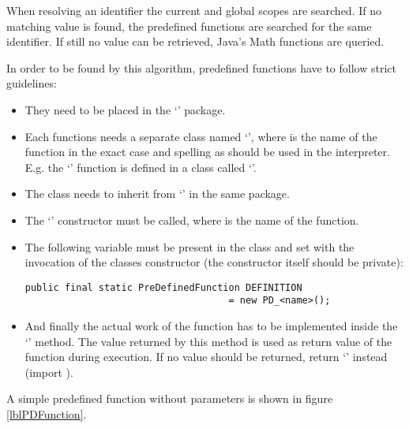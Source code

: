 When resolving an identifier the current and global scopes are searched. If no matching value is found, the predefined functions are searched for the same identifier. If still no value can be retrieved, Java's Math functions are queried.

In order to be found by this algorithm, predefined functions have to follow strict guidelines:

\begin{itemize}
	\item They need to be placed in the `' package.
	\item Each functions needs a separate class named `', where  is the name of the function in the exact case and spelling as should be used in the interpreter.\\
		E.g. the `' function is defined in a class called `'.
	\item The class needs to inherit from `' in the same package.
	\item The `' constructor must be called, where  is the name of the function.
	\item The following variable must be present in the class and set with the invocation of the classes constructor (the constructor itself should be private):
\begin{lstlisting}[frame=none,numbers=none]
public final static PreDefinedFunction DEFINITION
                                    = new PD_<name>();
\end{lstlisting}
	\item And finally the actual work of the function has to be implemented inside the `' method. The value returned by this method is used as return value of the function during execution. If no value should be returned, return `' instead (import ).

\end{itemize}

A simple predefined function without parameters is shown in figure \ref{lblPDFunction}.



